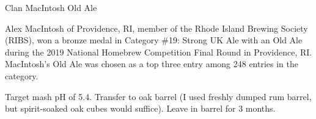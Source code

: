 \stylesection{\styleoldale}

\begin{recipe}{Clan MacIntosh Old Ale}

\begin{aboutblock}
Alex MacIntosh of Providence, RI, member of the Rhode Island Brewing Society
(RIBS), won a bronze medal in Category \#19: Strong UK Ale with an Old Ale
during the 2019 National Homebrew Competition Final Round in Providence, RI.
MacIntosh's Old Ale was chosen as a top three entry among 248 entries in the
category. \sourceaha
\end{aboutblock}


\begin{methodandtiming}
 
\begin{mashsteps}
\end{mashsteps}

\begin{fermentationsteps}
\end{fermentationsteps}

\begin{directions}
Target mash pH of 5.4. Transfer to oak barrel (I used freshly dumped rum barrel, but
spirit-soaked oak cubes would suffice). Leave in barrel for 3 months.
\end{directions}

\end{methodandtiming}

\recipebreak

\begin{ingredientsblock}

\begin{malts}
\end{malts}

\begin{hops}
\end{hops}


\end{ingredientsblock}

\end{recipe}

